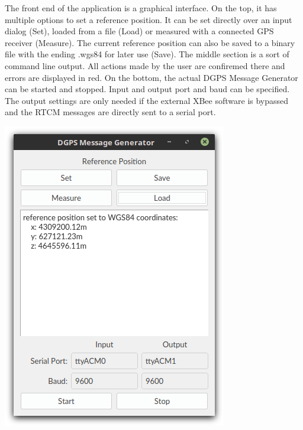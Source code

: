 \begin{minipage}{0.5\textwidth}
 The front end of the application is a graphical interface.
 On the top, it has multiple options to set a reference position.
 It can be set directly over an input dialog (Set), loaded from a file (Load) or measured with a connected GPS receiver (Measure).
 The current reference position can also be saved to a binary file with the ending .wgs84 for later use (Save).
 The middle section is a sort of command line output.
 All actions made by the user are confiremed there and errors are displayed in red.
 On the bottom, the actual DGPS Message Generator can be started and stopped.
 Input and output port and baud can be specified.
 The output settings are only needed if the external XBee software is bypassed and the RTCM messages are directly sent to a serial port.
\end{minipage}
\hfill
\begin{minipage}{0.45\textwidth}
 \centering
 \includegraphics[width=\textwidth]{images/GUI.png}
 \label{fig:gui}
\end{minipage}

